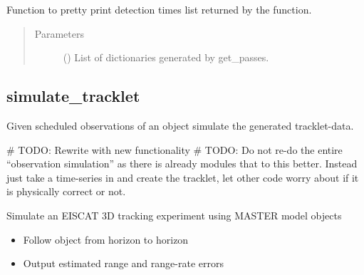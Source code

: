 \documentclass[letterpaper,10pt,english]{sphinxmanual}
\begin{document}

\begin{fulllineitems}
\label{\detokenize{modules/simulate_tracking:simulate_tracking.print_passes}}
Function to pretty print detection times list returned by the {\hyperref[\detokenize{modules/simulate_tracking:simulate_tracking.get_passes}]{}} function.
\begin{quote}\begin{description}
\item[{Parameters}] \leavevmode
{} () \textendash{} List of dictionaries generated by get\_passes.

\end{description}\end{quote}

\end{fulllineitems}



\subsection{simulate\_tracklet}
\label{\detokenize{modules/simulate_tracklet:module-simulate_tracklet}}\label{\detokenize{modules/simulate_tracklet:simulate-tracklet}}\label{\detokenize{modules/simulate_tracklet::doc}}
Given scheduled observations of an object simulate the generated tracklet-data.

\# TODO: Rewrite with new functionality
\# TODO: Do not re-do the entire “observation simulation” as there is already modules that to this better. Instead just take a time-series in and create the tracklet, let other code worry about if it is physically correct or not.

Simulate an EISCAT 3D tracking experiment using MASTER model objects
\begin{itemize}
\item {} 
Follow object from horizon to horizon

\item {} 
Output estimated range and range-rate errors

\end{itemize}
\end{document}
